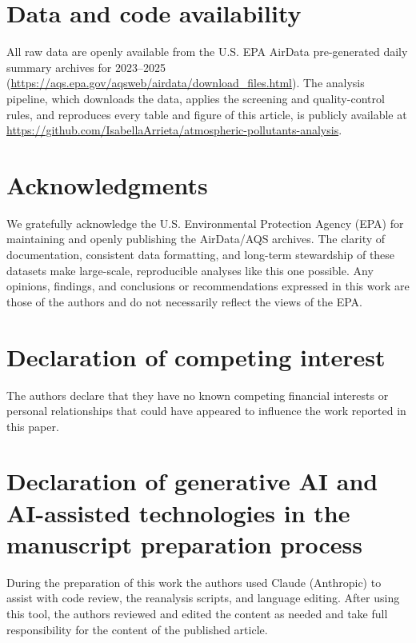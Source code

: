 \documentclass[a4paper,fleqn]{cas-sc}
\begin{document}
\section*{Data and code availability}
All raw data are openly available from the U.S. EPA AirData pre-generated daily summary archives for 2023--2025 (\url{https://aqs.epa.gov/aqsweb/airdata/download_files.html}). The analysis pipeline, which downloads the data, applies the screening and quality-control rules, and reproduces every table and figure of this article, is publicly available at \url{https://github.com/IsabellaArrieta/atmospheric-pollutants-analysis}.

\section*{Acknowledgments}
We gratefully acknowledge the U.S. Environmental Protection Agency (EPA) for maintaining and openly publishing the AirData/AQS archives. The clarity of documentation, consistent data formatting, and long-term stewardship of these datasets make large-scale, reproducible analyses like this one possible. Any opinions, findings, and conclusions or recommendations expressed in this work are those of the authors and do not necessarily reflect the views of the EPA.

\section*{Declaration of competing interest}
The authors declare that they have no known competing financial interests or personal relationships that could have appeared to influence the work reported in this paper.

\section*{Declaration of generative AI and AI-assisted technologies in the manuscript preparation process}
During the preparation of this work the authors used Claude (Anthropic) to assist with code review, the reanalysis scripts, and language editing. After using this tool, the authors reviewed and edited the content as needed and take full responsibility for the content of the published article.

\printcredits

%



\end{document}

